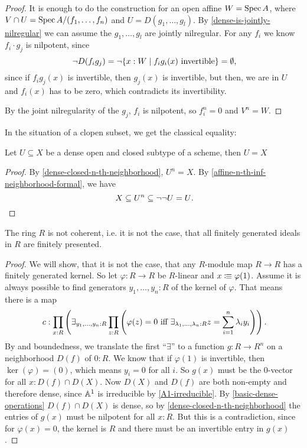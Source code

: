 \begin{proof}
  It is enough to do the construction for an open affine $W=\operatorname{Spec} A$,
  where $V\cap U=\operatorname{Spec} A/(f_1,\dots,f_n)$ and
  $U=D(g_1,\dots,g_l)$.
  By \cref{dense-is-jointly-nilregular} we can assume the $g_1,\dots,g_l$
  are jointly nilregular.
  For any $f_i$ we know $f_i\cdot g_j$ is nilpotent, since
  \[ \neg D(f_ig_j)=\neg\{x:W\mid f_ig_i(x)\text{ invertible}\} =\emptyset\rlap{,}\]
  since if $f_ig_j(x)$ is invertible, then $g_j(x)$ is invertible, but then, we are in
  $U$ and $f_i(x)$ has to be zero, which contradicts its invertibility.

  By the joint nilregularity of the $g_j$, $f_i$ is nilpotent,
  so $f_i^n=0$ and $V^n=W$.
\end{proof}

In the situation of a clopen subset, we get the classical equality:

\begin{lemma}%
  \label{clopen-dense-is-all}
  Let $U\subseteq X$ be a dense open and closed subtype of a scheme,
  then $U=X$
\end{lemma}

\begin{proof}
  By \cref{dense-closed-n-th-neighborhood},
  $U^n=X$.
  By \cref{affine-n-th-inf-neighborhood-formal}, we have
  \[
    X\subseteq U^n\subseteq \neg\neg U = U\rlap{.}
  \]
\end{proof}

\begin{theorem}%
  The ring $R$ is not coherent, i.e. it is not the case,
  that all finitely generated ideals in $R$ are finitely presented.
\end{theorem}

\begin{proof}
  We will show, that it is not the case,
  that any $R$-module map $R\to R$ has a finitely generated kernel.
  So let $\varphi:R\to R$ be $R$-linear and $x\vcentcolon\mspace{-1.2mu}\equiv \varphi(1)$.
  Assume it is always possible to find generators $y_1,\dots,y_n:R$ of the kernel of $\varphi$.
  That means there is a map
  \[
    c:\prod_{x:R}
    \left(
      \exists_{y_1,\dots,y_n:R}
      \prod_{z:R}
      \left(
        \varphi(z)=0 \text{ iff } \exists_{\lambda_1,\dots,\lambda_n:R}z=\sum_{i=1}^n \lambda_i y_i
      \right)
    \right)
    \rlap{.}
  \]
  By  and boundedness,
  we translate the first ``$\exists$'' to a function $g:R\to R^n$ on a neighborhood $D(f)$ of $0:R$.
  We know that if $\varphi(1)$ is invertible, then $\ker(\varphi)=(0)$, which means $y_i=0$ for all $i$.
  So $g(x)$ must be the 0-vector for all $x:D(f)\cap D(X)$.
  Now $D(X)$ and $D(f)$ are both non-empty and therefore dense,
  since $\mathbb{A}^1$ is irreducible by \cref{A1-irreducible}.
  By \cref{basic-dense-operations} $D(f)\cap D(X)$ is dense,
  so by \cref{dense-closed-n-th-neighborhood} the entries of $g(x)$ must be nilpotent for all $x:R$.
  But this is a contradiction, since for $\varphi(x)=0$,
  the kernel is $R$ and there must be an invertible entry in $g(x)$.
\end{proof}

